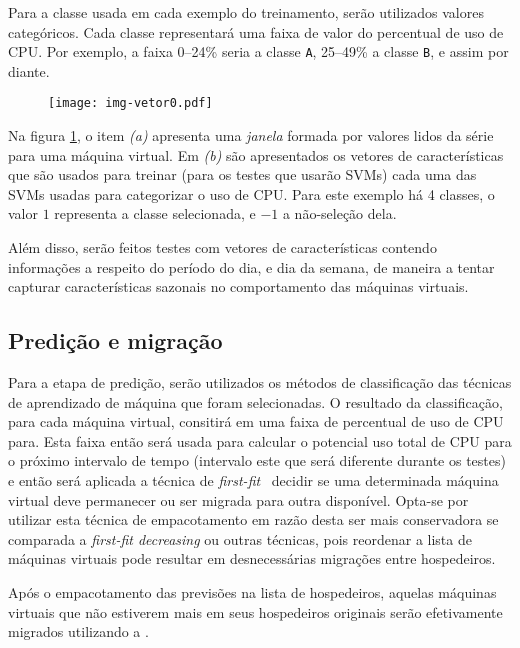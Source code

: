 Para a classe usada em cada exemplo do treinamento, serão utilizados
valores categóricos. Cada classe representará uma faixa de valor do
percentual de uso de CPU. Por exemplo, a faixa 0--24\% seria a classe
\texttt{A}, 25--49\% a classe \texttt{B}, e assim por diante.

\begin{figure}[htp]
\centering
\texttt{[image: img-vetor0.pdf]}
\label{fig:vetor0}
\end{figure}

Na figura \ref{fig:vetor0}, o item \emph{(a)} apresenta uma \emph{janela}
formada por valores lidos da série para uma máquina virtual. Em \emph{(b)}
são apresentados os vetores de características que são usados para treinar
(para os testes que usarão SVMs) cada uma das SVMs usadas para categorizar
o uso de CPU. Para este exemplo há 4 classes, o valor $1$ representa a
classe selecionada, e $-1$ a não-seleção dela.

Além disso, serão feitos testes com vetores de características contendo
informações a respeito do período do dia, e dia da semana, de maneira a
tentar capturar características sazonais no comportamento das máquinas
virtuais.

\subsection{Predição e migração}

Para a etapa de predição, serão utilizados os métodos de classificação das
técnicas de aprendizado de máquina que foram selecionadas. O resultado da
classificação, para cada máquina virtual, consitirá em uma faixa de
percentual de uso de CPU para. Esta faixa então será usada para calcular o
potencial uso total de CPU para o próximo intervalo de tempo (intervalo
este que será diferente durante os testes) e então será aplicada a técnica
de \emph{first-fit}~\cite{yao1980new} decidir se uma determinada máquina
virtual deve permanecer ou ser migrada para outra disponível. Opta-se por
utilizar esta técnica de empacotamento em razão desta ser mais conservadora
se comparada a \emph{first-fit decreasing} ou outras técnicas, pois
reordenar a lista de máquinas virtuais pode resultar em desnecessárias
migrações entre hospedeiros.

Após o empacotamento das previsões na lista de hospedeiros, aquelas
máquinas virtuais que não estiverem mais em seus hospedeiros originais
serão efetivamente migrados utilizando a \libvirt{}.

